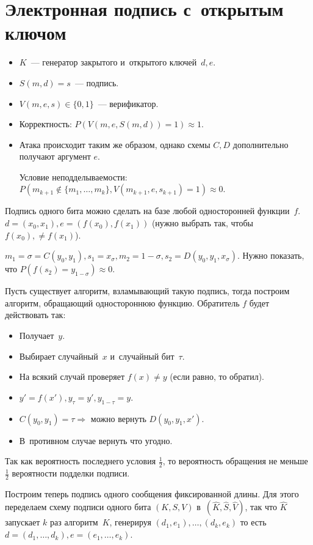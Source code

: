 \documentclass{article}
\begin{document}
\section{Электронная подпись с~открытым ключом}

\begin{itemize}
	\item $K$~--- генератор закрытого и~открытого ключей~$d, e$.
	\item $S(m, d) = s$~--- подпись.
	\item $V(m, e, s) \in \{0, 1\}$~--- верификатор.
	\item Корректность: $P(V(m, e, S(m, d)) = 1) \approx 1$.
	\item Атака происходит таким же образом, однако схемы $C, D$ дополнительно
		получают аргумент $e$.

		Условие неподделываемости: $P(m_{k+1} \notin \{m_1, \ldots, m_k\},
		V(m_{k+1}, e, s_{k+1}) = 1) \approx 0$.
\end{itemize}

Подпись одного бита можно сделать на базе любой односторонней функции~$f$. $d =
(x_0, x_1), e = (f(x_0), f(x_1))$ (нужно выбрать так, чтобы $f(x_0), \ne
f(x_1)$).

$m_1 = \sigma = C(y_0, y_1), s_1 = x_\sigma, m_2 = 1 - \sigma, s_2 =
D(y_0, y_1, x_\sigma)$. Нужно показать, что $P(f(s_2) = y_{1-\sigma}) \approx
0$.

Пусть существует алгоритм, взламывающий такую подпись, тогда построим алгоритм,
обращающий одностороннюю функцию. Обратитель $f$ будет действовать так:
\begin{itemize}
	\item Получает~$y$.
	\item Выбирает случайный~$x$ и~случайный бит~$\tau$.
	\item На всякий случай проверяет $f(x) \ne y$ (если равно, то обратил).
	\item $y' = f(x'), y_\tau = y', y_{1-\tau} = y$.
	\item $C(y_0, y_1) = \tau \Rightarrow $ можно вернуть $D(y_0, y_1, x')$.
	\item В~противном случае вернуть что угодно.
\end{itemize}

Так как вероятность последнего условия $\frac{1}{2}$, то вероятность обращения
не меньше $\frac{1}{2}$ вероятности подделки подписи.

Построим теперь подпись одного сообщения фиксированной длины. Для этого
переделаем схему подписи одного бита $(K, S, V)$ в~$(\hat K, \hat S, \hat V)$,
так что $\hat K$ запускает $k$ раз алгоритм~$K$, генерируя $(d_1, e_1), \ldots,
(d_k, e_k)$ то есть $d = (d_1, \ldots, d_k), e = (e_1, \ldots, e_k)$.
\end{document}
